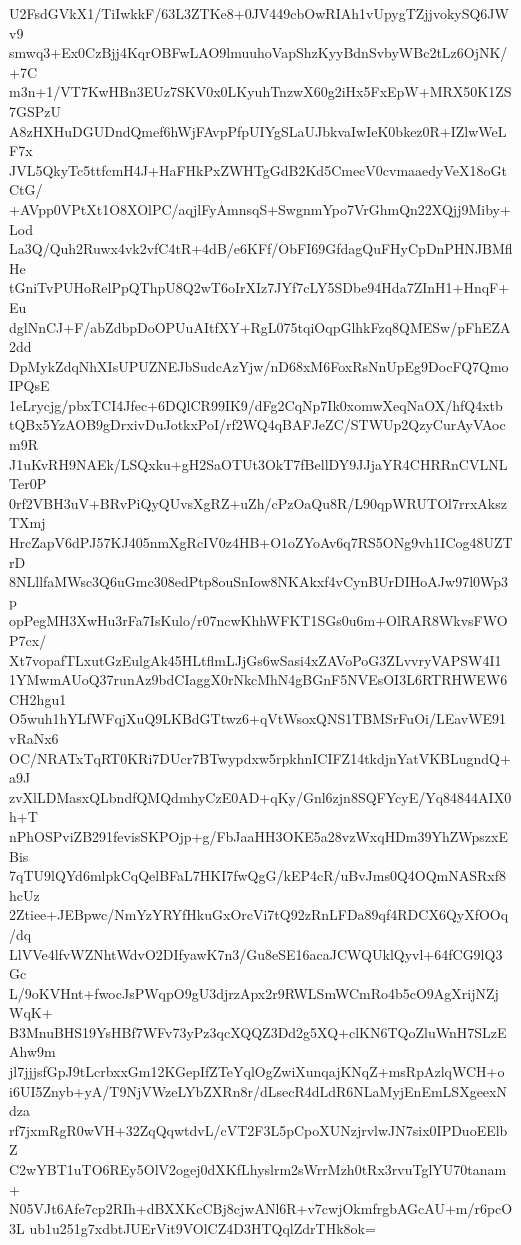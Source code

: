 U2FsdGVkX1/TiIwkkF/63L3ZTKe8+0JV449cbOwRIAh1vUpygTZjjvokySQ6JWv9
smwq3+Ex0CzBjj4KqrOBFwLAO9lmuuhoVapShzKyyBdnSvbyWBc2tLz6OjNK/+7C
m3n+1/VT7KwHBn3EUz7SKV0x0LKyuhTnzwX60g2iHx5FxEpW+MRX50K1ZS7GSPzU
A8zHXHuDGUDndQmef6hWjFAvpPfpUIYgSLaUJbkvaIwIeK0bkez0R+IZlwWeLF7x
JVL5QkyTc5ttfcmH4J+HaFHkPxZWHTgGdB2Kd5CmecV0cvmaaedyVeX18oGtCtG/
+AVpp0VPtXt1O8XOlPC/aqjlFyAmnsqS+SwgnmYpo7VrGhmQn22XQjj9Miby+Lod
La3Q/Quh2Ruwx4vk2vfC4tR+4dB/e6KFf/ObFI69GfdagQuFHyCpDnPHNJBMflHe
tGniTvPUHoRelPpQThpU8Q2wT6oIrXIz7JYf7cLY5SDbe94Hda7ZInH1+HnqF+Eu
dglNnCJ+F/abZdbpDoOPUuAItfXY+RgL075tqiOqpGlhkFzq8QMESw/pFhEZA2dd
DpMykZdqNhXIsUPUZNEJbSudcAzYjw/nD68xM6FoxRsNnUpEg9DocFQ7QmoIPQsE
1eLrycjg/pbxTCI4Jfec+6DQlCR99IK9/dFg2CqNp7Ik0xomwXeqNaOX/hfQ4xtb
tQBx5YzAOB9gDrxivDuJotkxPoI/rf2WQ4qBAFJeZC/STWUp2QzyCurAyVAocm9R
J1uKvRH9NAEk/LSQxku+gH2SaOTUt3OkT7fBellDY9JJjaYR4CHRRnCVLNLTer0P
0rf2VBH3uV+BRvPiQyQUvsXgRZ+uZh/cPzOaQu8R/L90qpWRUTOl7rrxAkszTXmj
HrcZapV6dPJ57KJ405nmXgRcIV0z4HB+O1oZYoAv6q7RS5ONg9vh1ICog48UZTrD
8NLllfaMWsc3Q6uGmc308edPtp8ouSnIow8NKAkxf4vCynBUrDIHoAJw97l0Wp3p
opPegMH3XwHu3rFa7IsKulo/r07ncwKhhWFKT1SGs0u6m+OlRAR8WkvsFWOP7cx/
Xt7vopafTLxutGzEulgAk45HLtflmLJjGs6wSasi4xZAVoPoG3ZLvvryVAPSW4I1
1YMwmAUoQ37runAz9bdCIaggX0rNkcMhN4gBGnF5NVEsOI3L6RTRHWEW6CH2hgu1
O5wuh1hYLfWFqjXuQ9LKBdGTtwz6+qVtWsoxQNS1TBMSrFuOi/LEavWE91vRaNx6
OC/NRATxTqRT0KRi7DUcr7BTwypdxw5rpkhnICIFZ14tkdjnYatVKBLugndQ+a9J
zvXlLDMasxQLbndfQMQdmhyCzE0AD+qKy/Gnl6zjn8SQFYcyE/Yq84844AIX0h+T
nPhOSPviZB291fevisSKPOjp+g/FbJaaHH3OKE5a28vzWxqHDm39YhZWpszxEBis
7qTU9lQYd6mlpkCqQelBFaL7HKI7fwQgG/kEP4cR/uBvJms0Q4OQmNASRxf8hcUz
2Ztiee+JEBpwc/NmYzYRYfHkuGxOrcVi7tQ92zRnLFDa89qf4RDCX6QyXfOOq/dq
LlVVe4lfvWZNhtWdvO2DIfyawK7n3/Gu8eSE16acaJCWQUklQyvl+64fCG9lQ3Gc
L/9oKVHnt+fwocJsPWqpO9gU3djrzApx2r9RWLSmWCmRo4b5cO9AgXrijNZjWqK+
B3MnuBHS19YsHBf7WFv73yPz3qcXQQZ3Dd2g5XQ+clKN6TQoZluWnH7SLzEAhw9m
jl7jjjsfGpJ9tLcrbxxGm12KGepIfZTeYqlOgZwiXunqajKNqZ+msRpAzlqWCH+o
i6UI5Znyb+yA/T9NjVWzeLYbZXRn8r/dLsecR4dLdR6NLaMyjEnEmLSXgeexNdza
rf7jxmRgR0wVH+32ZqQqwtdvL/cVT2F3L5pCpoXUNzjrvlwJN7six0IPDuoEElbZ
C2wYBT1uTO6REy5OlV2ogej0dXKfLhyslrm2sWrrMzh0tRx3rvuTglYU70tanam+
N05VJt6Afe7cp2RIh+dBXXKcCBj8cjwANl6R+v7cwjOkmfrgbAGcAU+m/r6pcO3L
ub1u251g7xdbtJUErVit9VOlCZ4D3HTQqlZdrTHk8ok=
